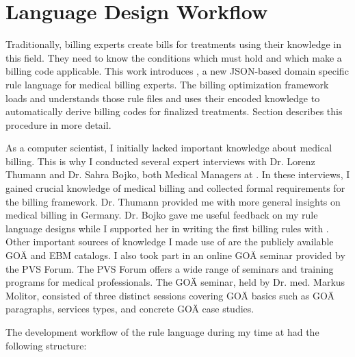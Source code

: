 \section{Language Design Workflow}\label{sec:language-design-workflow}
Traditionally, billing experts create bills for treatments using their knowledge in this field.
They need to know the conditions which must hold and which make a billing code applicable.
This work introduces \RL, a new JSON-based domain specific rule language for medical billing experts.
The billing optimization framework loads and understands those rule files and uses their encoded knowledge to automatically derive billing codes for finalized treatments.
Section  describes this procedure in more detail.

As a computer scientist, I initially lacked important knowledge about medical billing.
This is why I conducted several expert interviews with Dr. Lorenz Thumann and Dr. Sahra Bojko, both Medical Managers at \AV.
In these interviews, I gained crucial knowledge of medical billing and collected formal requirements for the billing framework.
Dr. Thumann provided me with more general insights on medical billing in Germany.
Dr. Bojko gave me useful feedback on my rule language designs while I supported her in writing the first billing rules with \RL.
Other important sources of knowledge I made use of are the publicly available GOÄ and EBM catalogs.
I also took part in an online GOÄ seminar provided by the PVS Forum.
The PVS Forum offers a wide range of seminars and training programs for medical professionals.
The GOÄ seminar, held by Dr. med. Markus Molitor,
consisted of three distinct sessions covering GOÄ basics such as GOÄ paragraphs, services types, and concrete GOÄ case studies.

The development workflow of the rule language during my time at \AV had the following structure:

